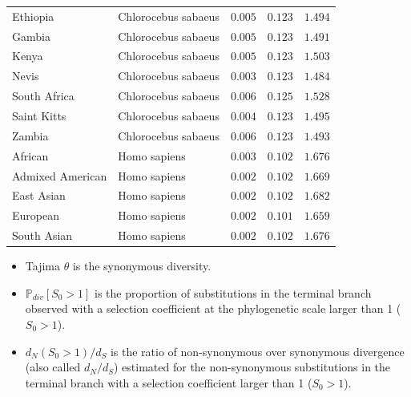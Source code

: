 \documentclass{article}
\newcommand{\dn}{d_N}
\newcommand{\ds}{d_S}
\newcommand{\dnds}{\dn / \ds}
\newcommand{\Sphy}{S_{0}}
\begin{document}
\begin{center}
\begin{longtable*}{|l|l|r|r|r|}
            Ethiopia & Chlorocebus sabaeus &               $ 0.005$ &                $ 0.123$ &              $ 1.494$ \\
            Gambia & Chlorocebus sabaeus &               $ 0.005$ &                $ 0.123$ &              $ 1.491$ \\
            Kenya & Chlorocebus sabaeus &               $ 0.005$ &                $ 0.123$ &              $ 1.503$ \\
            Nevis & Chlorocebus sabaeus &               $ 0.003$ &                $ 0.123$ &              $ 1.484$ \\
            South Africa & Chlorocebus sabaeus &               $ 0.006$ &                $ 0.125$ &              $ 1.528$ \\
            Saint Kitts & Chlorocebus sabaeus &               $ 0.004$ &                $ 0.123$ &              $ 1.495$ \\
            Zambia & Chlorocebus sabaeus &               $ 0.006$ &                $ 0.123$ &              $ 1.493$ \\
            African &        Homo sapiens &               $ 0.003$ &                $ 0.102$ &              $ 1.676$ \\
            Admixed American &        Homo sapiens &               $ 0.002$ &                $ 0.102$ &              $ 1.669$ \\
            East Asian &        Homo sapiens &               $ 0.002$ &                $ 0.102$ &              $ 1.682$ \\
            European &        Homo sapiens &               $ 0.002$ &                $ 0.101$ &              $ 1.659$ \\
            South Asian &        Homo sapiens &               $ 0.002$ &                $ 0.102$ &              $ 1.676$ \\
        \end{longtable*}
    \end{center}
    \begin{itemize}
        \item Tajima $\theta$ is the synonymous diversity.
        \item $\mathbb{P}_{div}[\Sphy > 1]$ is the proportion of substitutions in the terminal branch observed with a selection coefficient at the phylogenetic scale larger than 1 ($\Sphy > 1$).
        \item $\dn(\Sphy > 1) / \ds$ is the ratio of non-synonymous over synonymous divergence (also called $\dnds$) estimated for the non-synonymous substitutions in the terminal branch with a selection coefficient larger than 1 ($\Sphy > 1$).
    \end{itemize}
\end{document}
